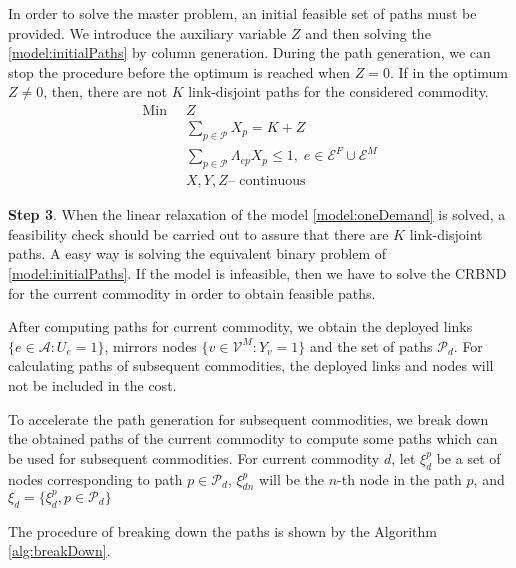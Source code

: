 \documentclass[onecolumn,11pt,draftclsnofoot]{IEEEtran}
\begin{document}
In order to solve the master problem, an initial feasible set of paths must be provided. We introduce the auxiliary variable $Z$ and then solving the \eqref{model:initialPaths} by column generation. During the path generation, we can stop the procedure before the optimum is reached when $Z=0$. If in the optimum $Z \neq 0$,  then, there are not $K$ link-disjoint paths for the considered commodity. 
\begin{subequations}\label{model:initialPaths}
\begin{align}
\mbox{Min} \;\; & Z \label{eq:initialPaths-1}\\
& \mbox{$\sum_{p \in \mathcal P} X_{p} =K + Z$} \label{eq:initialPaths-2}\\
& \mbox{$\sum_{p \in \mathcal P} \Lambda_{ep} X_{p} \leq 1$}, \; e \in \mathcal E^F \cup \mathcal E^M  \label{eq:initialPaths-3}\\
& X,Y,Z \mbox{-- continuous} \nonumber
\end{align}
\end{subequations}

\textbf{Step 3}. When the linear relaxation of the model \eqref{model:oneDemand} is solved, a feasibility check should be carried out to assure that there are $K$ link-disjoint paths. A easy way is solving the equivalent binary problem of \eqref{model:initialPaths}. If the model is infeasible, then we have to solve the CRBND for the current commodity in order to obtain feasible paths.


After computing paths for current commodity, we obtain the deployed links $\{e \in \mathcal A: U_e =1\}$, mirrors nodes $\{v \in \mathcal V^M: Y_v =1 \}$ and the set of paths $\mathcal P_d$. For calculating paths of subsequent commodities, the deployed links and nodes will not be included in the cost.

To accelerate the path generation for subsequent commodities, we break down the obtained paths of the current commodity to compute some paths which can be used for subsequent commodities.
For current commodity $d$, let $\xi^p_{d}$ be a set of nodes corresponding to path $p \in \mathcal P_d$, $\xi^p_{dn}$ will be the $n$-th node in the path $p$, and $\xi_d =\{\xi^p_{d}, p \in \mathcal P_d\}$


The procedure of breaking down the paths is shown by the Algorithm \ref{alg:breakDown}.
\end{document}
